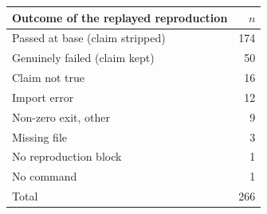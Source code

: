 %
%
\begin{tabular}{@{}lr@{}}
\toprule
Outcome of the replayed reproduction & $n$ \\
\midrule
Passed at base (claim stripped)     & 174 \\
Genuinely failed (claim kept)       & \phantom{0}50 \\
Claim not true                      & \phantom{0}16 \\
Import error                        & \phantom{0}12 \\
Non-zero exit, other                & \phantom{00}9 \\
Missing file                        & \phantom{00}3 \\
No reproduction block               & \phantom{00}1 \\
No command                          & \phantom{00}1 \\
\midrule
Total                               & 266 \\
\bottomrule
\end{tabular}


